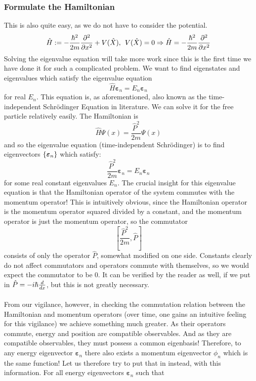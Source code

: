 \subsubsection*{Formulate the Hamiltonian}
This is also quite easy, as we do not have to consider the potential.
$$
\hat{H}:=-\frac{\hbar^2}{2m}\frac{\partial^2}{\partial x^2}+V(\hat{X}), \:\: V(\hat{X})=0 \Rightarrow \hat{H}=-\frac{\hbar^2}{2m}\frac{\partial^2}{\partial x^2}
$$
Solving the eigenvalue equation will take more work since this is the first time we have done it for such a complicated problem. We want to find eigenstates and eigenvalues which satisfy the eigenvalue equation
$$
\hat{H}\bm{\varepsilon}_{n}=E_{n}\bm{\varepsilon}_{n}
$$
for real $E_{n}$. This equation is, as aforementioned, also known as the time-independent Schr\"{o}dinger Equation in literature. We can solve it for the free particle relatively easily. The Hamiltonian is
$$
\hat{H}\Psi(x)=\frac{\hat{P}^2}{2m}\Psi(x)
$$
and so the eigenvalue equation (time-independent Schr\"{o}dinger) is to find eigenvectors $\{\bm{\varepsilon}_{n}\}$ which satisfy:
$$
\frac{\hat{P}^2}{2m}\bm{\varepsilon}_{n}=E_{n}\bm{\varepsilon}_{n}
$$
for some real constant eigenvalues $E_{n}$. The crucial insight for this eigenvalue equation is that the Hamiltonian operator of the system commutes with the momentum operator! This is intuitively obvious, since the Hamiltonian operator is the momentum operator squared divided by a constant, and the momentum operator is just the momentum operator, so the commutator 
$$
\left[\frac{\hat{P}^2}{2m},\hat{P}\right]
$$
consists of only the operator $\hat{P}$, somewhat modified on one side. Constants clearly do not affect commutators and operators commute with themselves, so we would expect the commutator to be $0$. It can be verified by the reader as well, if we put in $\hat{P}=-i\hbar\frac{d}{d x}$, but this is not greatly necessary.
\\\\
From our vigilance, however, in checking the commutation relation between the Hamiltonian and momentum operators (over time, one gains an intuitive feeling for this vigilance) we achieve something much greater. As their operators commute, energy and position are compatible observables. And as they are compatible observables, they must possess a common eigenbasis! Therefore, to any energy eigenvector $\bm{\varepsilon}_{n}$ there also exists a momentum eigenvector $\phi_{n}$ which is the same function! Let us therefore try to put that in instead, with this information. For all energy eigenvectors $\bm{\varepsilon}_{n}$ such that
